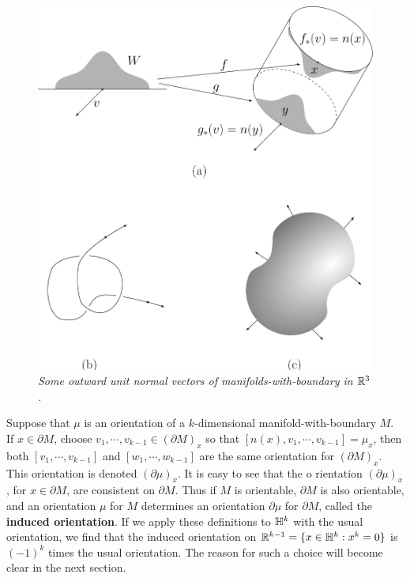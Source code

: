 \begin{figure}[!htb]
    \centering
    \includegraphics[width=.75\linewidth]{./pics/Fig5-8.pdf}
    \caption{\textit{Some outward unit normal vectors of manifolds-with-boundary in $\mathbb{R}^3$.}}
    \label{Fig 5-8}
\end{figure}

Suppose that $\mu$ is an orientation of a $k$-dimensional manifold-with-boundary $M$. If $x\in\partial M$,
choose $v_1,\cdots,v_{k-1}\in(\partial M)_x$ so that $[n(x), v_1, \cdots, v_{k-1}]=\mu_x$, then both 
$[v_1,\cdots,v_{k-1}]$ and $[w_1,\cdots,w_{k-1}]$ are the same orientation for $(\partial M)_x$. This 
orientation is denoted $(\partial\mu)_x$. It is easy to see that the o  rientation $(\partial\mu)_x$, for 
$x\in\partial M$, are consistent on $\partial M$. Thus if $M$ is orientable, $\partial M$ is also orientable,
and an orientation $\mu$ for $M$ determines an orientation $\partial\mu$ for $\partial M$, called the 
\textbf{induced orientation}. If we apply these definitions to $\mathbb{H}^k$ with the usual orientation, 
we find that the induced orientation on $\mathbb{R}^{k-1}=\{x\in\mathbb{H}^k:x^k=0\}$ is $(-1)^k$ times the usual orientation.
The reason for such a choice will become clear in the next section.

